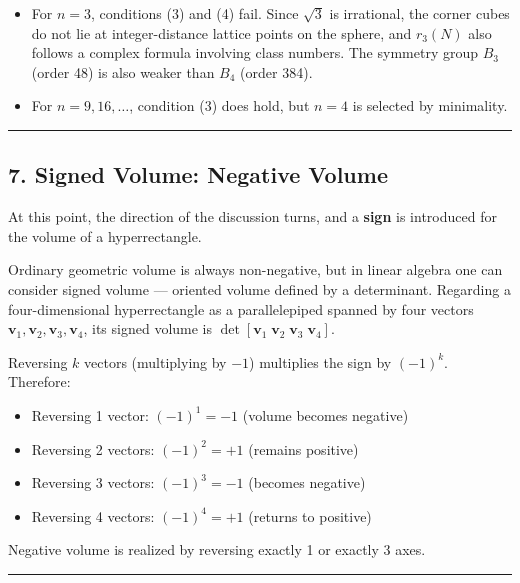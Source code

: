\documentclass[a4paper,11pt]{article}
\theoremstyle{definition}
\providecommand{\tightlist}{\setlength{\itemsep}{0pt}\setlength{\parskip}{0pt}}
\begin{document}
\begin{itemize}
\tightlist
\item
  For \(n = 3\), conditions (3) and (4) fail. Since \(\sqrt{3}\) is
  irrational, the corner cubes do not lie at integer-distance lattice
  points on the sphere, and \(r_3(N)\) also follows a complex formula
  involving class numbers. The symmetry group \(B_3\) (order 48) is also
  weaker than \(B_4\) (order 384).
\item
  For \(n = 9, 16, \ldots\), condition (3) does hold, but \(n = 4\) is
  selected by minimality.
\end{itemize}

\begin{center}\rule{0.5\linewidth}{0.5pt}\end{center}

\subsection{7. Signed Volume: Negative
Volume}\label{signed-volume-negative-volume}

At this point, the direction of the discussion turns, and a
\textbf{sign} is introduced for the volume of a hyperrectangle.

Ordinary geometric volume is always non-negative, but in linear algebra
one can consider signed volume --- oriented volume defined by a
determinant. Regarding a four-dimensional hyperrectangle as a
parallelepiped spanned by four vectors
\(\mathbf{v}_1, \mathbf{v}_2, \mathbf{v}_3, \mathbf{v}_4\), its signed
volume is
\(\det[\mathbf{v}_1 \; \mathbf{v}_2 \; \mathbf{v}_3 \; \mathbf{v}_4]\).

Reversing \(k\) vectors (multiplying by \(-1\)) multiplies the sign by
\((-1)^k\). Therefore:

\begin{itemize}
\tightlist
\item
  Reversing 1 vector: \((-1)^1 = -1\) (volume becomes negative)
\item
  Reversing 2 vectors: \((-1)^2 = +1\) (remains positive)
\item
  Reversing 3 vectors: \((-1)^3 = -1\) (becomes negative)
\item
  Reversing 4 vectors: \((-1)^4 = +1\) (returns to positive)
\end{itemize}

Negative volume is realized by reversing exactly 1 or exactly 3 axes.

\begin{center}\rule{0.5\linewidth}{0.5pt}\end{center}
\end{document}
